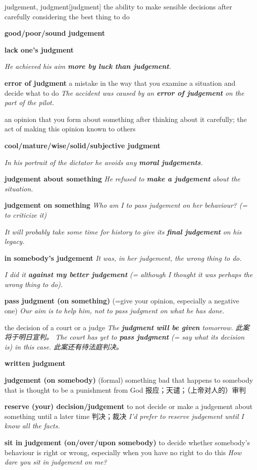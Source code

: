 \begin{DefWord}{judgement, judgment}[judgment]
    the ability to make sensible decisions after carefully considering the best thing to do
    
    \textbf{good/poor/sound judgement}

    \textbf{lack one's judgment}

    \textit{He achieved his aim \textbf{more by luck than judgement}.}

    \textbf{error of judgment} a mistake in the way that you examine a situation and decide what to do
    \textit{The accident was caused by an \textbf{error of judgement} on the part of the pilot.}

    an opinion that you form about something after thinking about it carefully; the act of making this opinion known to others

    \textbf{cool/mature/wise/solid/subjective judgment}

    \textit{In his portrait of the dictator he avoids any \textbf{moral judgements}.}

    \textbf{judgement about something} \textit{He refused to \textbf{make a judgement} about the situation.}

    \textbf{judgement on something} \textit{Who am I to pass judgement on her behaviour? (= to criticize it)}

    \textit{It will probably take some time for history to give its \textbf{final judgement} on his legacy.}

    \textbf{in somebody's judgement} \textit{It was, in her judgement, the wrong thing to do.}

    \textit{I did it \textbf{against my better judgement} (= although I thought it was perhaps the wrong thing to do).}

    \textbf{pass judgment (on something)}
    (=give your opinion, especially a negative one)
     \textit{Our aim is to help him, not to pass judgment on what he has done.}



    the decision of a court or a judge
    \textit{The \textbf{judgment will be given} tomorrow. 此案将于明日宣判。}
    \textit{The court has yet to \textbf{pass judgment} (= say what its decision is) in this case. 此案还有待法庭判决。}

    \textbf{written judgment}

    \textbf{judgement (on somebody)} (formal) something bad that happens to somebody that is thought to be a punishment from God 报应；天谴；（上帝对人的）审判

    \textbf{reserve (your) decision/judgement}
    to not decide or make a judgement about something until a later time 判决；裁决
    \textit{I'd prefer to reserve judgement until I know all the facts.}

    \textbf{sit in judgement (on/over/upon somebody)}
    to decide whether somebody's behaviour is right or wrong, especially when you have no right to do this
    \textit{How dare you sit in judgement on me?}
\end{DefWord}


